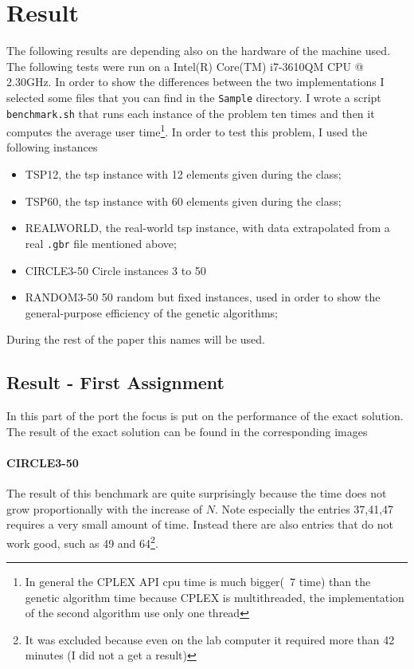 \section{Result}
\label{sec:result}
The following results are depending also on the hardware of the machine used.
The following tests were run on a  Intel(R) Core(TM) i7-3610QM CPU @ 2.30GHz.
In order to show the differences between the two implementations I selected some files
that you can find in the \verb|Sample| directory.
I wrote a script \verb|benchmark.sh| that runs
each instance of the problem ten times and then it computes the average
user time\footnote{In general the CPLEX API cpu time is much bigger(~7 time) than the genetic algorithm time
because CPLEX is multithreaded, the implementation of the second algorithm use only one thread}.
In order to test this problem, I used the 
following instances
\begin{itemize}
	\item TSP12, the tsp instance with 12 elements given during the class;
	\item TSP60, the tsp instance with 60 elements given during the class;
	\item REALWORLD, the real-world tsp instance, with data extrapolated from a real
	\verb|.gbr| file mentioned above;
	\item CIRCLE3-50 Circle instances 3 to 50
	\item RANDOM3-50 50 random but fixed instances, used in order to show the general-purpose efficiency of the genetic algorithms;
\end{itemize}
During the rest of the paper this names will be used.

\subsection{Result - First Assignment}
In this part of the port the focus is put on the performance of the exact solution.
The result of the exact solution can be found in the corresponding images

\paragraph{CIRCLE3-50}
The result of this benchmark are quite surprisingly because
the time does not grow proportionally with the increase of $N$.
Note especially the entries 37,41,47 requires a very small amount of time. Instead
there are also entries that do not work good, such as 49 and 64\footnote{It was excluded because even on the
lab computer it required more than 42 minutes (I did not a get a result)}.

